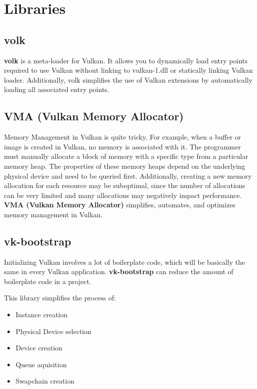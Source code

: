 \section{Libraries}

\subsection{volk}

\textbf{volk} \parencite{volk} is a meta-loader for Vulkan. It allows you to dynamically load entry points required to use Vulkan without linking to vulkan-1.dll or statically linking Vulkan loader. Additionally, volk simplifies the use of Vulkan extensions by automatically loading all associated entry points.

\subsection{VMA (Vulkan Memory Allocator)}\label{subsec:vma}

Memory Management in Vulkan is quite tricky. For example, when a buffer or image is created in Vulkan, no memory is associated with it. The programmer must manually allocate a block of memory with a specific type from a particular memory heap. The properties of these memory heaps depend on the underlying physical device and need to be queried first. Additionally, creating a new memory allocation for each resource may be suboptimal, since the number of allocations can be very limited and many allocations may negatively impact performance. \textbf{VMA (Vulkan Memory Allocator)} \parencite{vma} simplifies, automates, and optimizes memory management in Vulkan.

\subsection{vk-bootstrap}

Initializing Vulkan involves a lot of boilerplate code, which will be basically the same in every Vulkan application. \textbf{vk-bootstrap} \parencite{vk-bootstrap} can reduce the amount of boilerplate code in a project.

This library simplifies the process of:

\begin{itemize}
    \item Instance creation
    \item Physical Device selection
    \item Device creation
    \item Queue aquisition
    \item Swapchain creation
\end{itemize}

